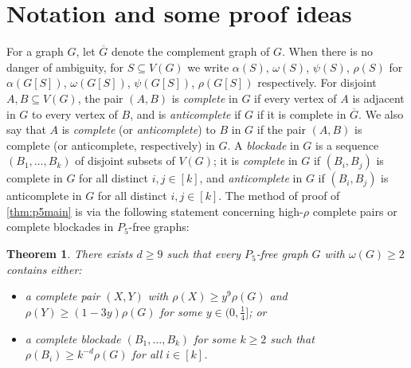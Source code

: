 \documentclass[11pt,reqno]{amsart}
\newtheorem{theorem}{Theorem}[section]
\renewcommand{\subset}{\subseteq}
\begin{document}
	\section{Notation and some proof ideas}
	\label{sec:sketch}
	For a graph $G$, let $\overline G$ denote the complement graph of $G$.
	When there is no danger of ambiguity, for $S\subset V(G)$ we write $\alpha(S)$, $\omega(S)$, $\psi(S)$, $\rho(S)$ for $\alpha(G[S])$, $\omega(G[S])$, $\psi(G[S])$, $\rho(G[S])$ respectively.
	For disjoint $A,B\subset V(G)$, the pair $(A,B)$ is {\em complete} in $G$ if every vertex of $A$ is adjacent in $G$ to every vertex of $B$, and is {\em anticomplete} if $G$ if it is complete in $\overline G$.
	We also say that $A$ is {\em complete} (or {\em anticomplete}) to $B$ in $G$ if the pair $(A,B)$ is complete (or anticomplete, respectively) in $G$.
	A {\em blockade} in $G$ is a sequence $(B_1,\ldots,B_k)$ of disjoint subsets of $V(G)$;
	it is {\em complete} in $G$ if $(B_i,B_j)$ is complete in $G$ for all distinct $i,j\in[k]$, and {\em anticomplete} in $G$ if $(B_i,B_j)$ is anticomplete in $G$ for all distinct $i,j\in[k]$.
	The method of proof of \cref{thm:p5main} is via the following statement concerning high-$\rho$ complete pairs or complete blockades in $P_5$-free graphs:
	\begin{theorem}
		\label{thm:main}
		There exists $d\ge9$ such that every $P_5$-free graph $G$ with $\omega(G)\ge2$ contains either:
		\begin{itemize}
			\item a complete pair $(X,Y)$ with $\rho(X)\ge y^9\rho(G)$ and $\rho(Y)\ge (1-3y)\rho(G)$ for some $y\in(0,\frac14]$; or
			
			\item a complete blockade $(B_1,\ldots,B_k)$ for some $k\ge2$ such that $\rho(B_i)\ge k^{-d}\rho(G)$ for all $i\in[k]$.
		\end{itemize}
	\end{theorem}
\end{document}
